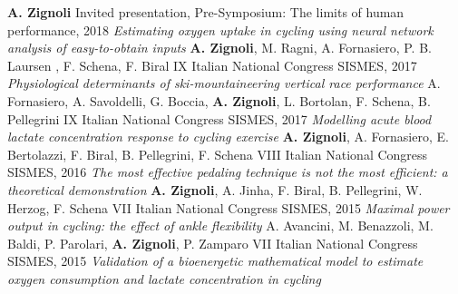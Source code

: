 \documentclass[helvetica,openbib,logo,notitle,flagCMYK,totpages]{europecv}
\begin{document}
\begin{europecv}
{	       \textbf{A. Zignoli} \newline
	       Invited presentation, Pre-Symposium: The limits of human performance, 2018 \newline 
	        \newline
	       \emph{ Estimating oxygen uptake in cycling using neural network analysis of easy-to-obtain inputs}             \newline
	       \textbf{A. Zignoli}, M. Ragni, A. Fornasiero, P. B. Laursen , F. Schena, F. Biral \newline
	       IX Italian National Congress SISMES, 2017 \newline 
	       \newline
	       \emph{ Physiological determinants of ski-mountaineering
vertical race performance}             \newline
	       A. Fornasiero, A. Savoldelli, G. Boccia, \textbf{A. Zignoli}, L. Bortolan, F. Schena, B. Pellegrini \newline
	       IX Italian National Congress SISMES, 2017 \newline 
	       \newline
	       \emph{ Modelling acute blood lactate concentration response to cycling exercise}\newline
	       \textbf{A. Zignoli}, A. Fornasiero, E. Bertolazzi, F. Biral, B. Pellegrini, F. Schena \newline
	       VIII Italian National Congress SISMES, 2016 \newline 
	       \newline
	       \emph{The most effective pedaling technique is not the most efficient: a theoretical demonstration}\newline
	       \textbf{A. Zignoli}, A. Jinha, F. Biral, B. Pellegrini, W. Herzog, F. Schena \newline
	       VII Italian National Congress SISMES, 2015 \newline 
	       \newline
	       \emph{Maximal power output in cycling: the effect of ankle flexibility} \newline
	       A. Avancini, M. Benazzoli, M. Baldi, P. Parolari, \textbf{A. Zignoli}, P. Zamparo \newline
	       VII Italian National Congress SISMES, 2015\newline
	       \newline
	         \emph{Validation of a bioenergetic mathematical model to estimate oxygen consumption and lactate concentration in cycling}\newline
}
\end{europecv}
\end{document}
